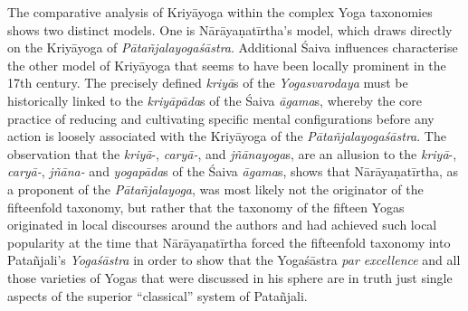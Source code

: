 The comparative analysis of Kriyāyoga within the complex Yoga taxonomies shows two distinct models. One is Nārāyaṇatīrtha's model, which draws directly on the Kriyāyoga of \textit{Pātañjalayogaśāstra}. Additional Śaiva influences characterise the other model of Kriyāyoga that seems to have been locally prominent in the 17th century. The precisely defined \textit{kriyā}s of the \textit{Yogasvarodaya} must be historically linked to the \textit{kriyāpāda}s of the Śaiva \textit{āgama}s, whereby the core practice of reducing and cultivating specific mental configurations before any action is loosely associated with the Kriyāyoga of the \textit{Pātañjalayogaśāstra}. The observation that the \textit{kriyā}-, \textit{caryā-}, and \textit{jñānayoga}s, are an allusion to the \textit{kriyā}-, \textit{caryā-}, \textit{jñāna-} and \textit{yogapāda}s of the Śaiva \textit{āgama}s, shows that Nārāyaṇatīrtha, as a proponent of the \textit{Pātañjalayoga}, was most likely not the originator of the fifteenfold taxonomy, but rather that the taxonomy of the fifteen Yogas originated in local discourses around the authors and had achieved such local popularity at the time that Nārāyaṇatīrtha forced the fifteenfold taxonomy into Patañjali's \textit{Yogaśāstra} in order to show that the Yogaśāstra \textit{par excellence} and all those varieties of Yogas that were discussed in his sphere are in truth just single aspects of the superior ``classical'' system of Patañjali.

